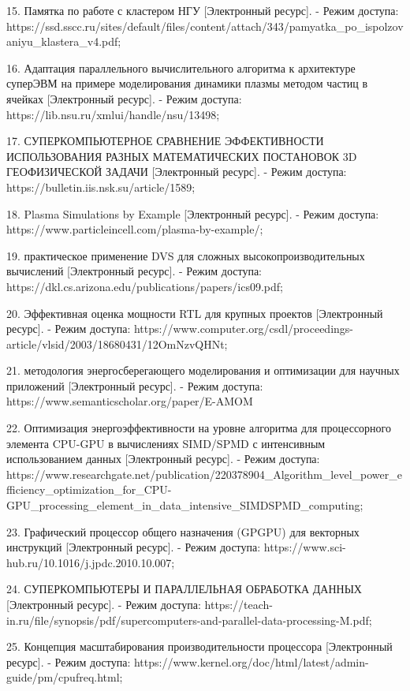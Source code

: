 \documentclass{article}
\begin{document}
15. Памятка по работе с кластером НГУ [Электронный ресурс].
   - Режим доступа: https://ssd.sscc.ru/sites/default/files/content/attach/343/pamyatka_po_ispolzovaniyu_klastera_v4.pdf;

16. Адаптация параллельного вычислительного алгоритма к архитектуре суперЭВМ на примере моделирования динамики плазмы методом частиц в ячейках [Электронный ресурс].
   - Режим доступа: https://lib.nsu.ru/xmlui/handle/nsu/13498;

17. СУПЕРКОМПЬЮТЕРНОЕ СРАВНЕНИЕ ЭФФЕКТИВНОСТИ ИСПОЛЬЗОВАНИЯ РАЗНЫХ МАТЕМАТИЧЕСКИХ ПОСТАНОВОК 3D ГЕОФИЗИЧЕСКОЙ ЗАДАЧИ [Электронный ресурс].
   - Режим доступа: https://bulletin.iis.nsk.su/article/1589;

18. Plasma Simulations by Example [Электронный ресурс].
   - Режим доступа: https://www.particleincell.com/plasma-by-example/;

19. практическое применение DVS для сложных высокопроизводительных вычислений [Электронный ресурс].
   - Режим доступа: https://dkl.cs.arizona.edu/publications/papers/ics09.pdf;

20. Эффективная оценка мощности RTL для крупных проектов [Электронный ресурс].
   - Режим доступа: https://www.computer.org/csdl/proceedings-article/vlsid/2003/18680431/12OmNzvQHNt;

21. методология энергосберегающего моделирования и оптимизации для научных приложений [Электронный ресурс].
   - Режим доступа: https://www.semanticscholar.org/paper/E-AMOM%

22. Оптимизация энергоэффективности на уровне алгоритма для процессорного элемента CPU-GPU в вычислениях SIMD/SPMD с интенсивным использованием данных [Электронный ресурс].
   - Режим доступа: https://www.researchgate.net/publication/220378904_Algorithm_level_power_efficiency_optimization_for_CPU-GPU_processing_element_in_data_intensive_SIMDSPMD_computing;

23. Графический процессор общего назначения (GPGPU) для векторных инструкций [Электронный ресурс].
   - Режим доступа: https://www.sci-hub.ru/10.1016/j.jpdc.2010.10.007;

24. СУПЕРКОМПЬЮТЕРЫ И ПАРАЛЛЕЛЬНАЯ ОБРАБОТКА ДАННЫХ [Электронный ресурс].
   - Режим доступа: https://teach-in.ru/file/synopsis/pdf/supercomputers-and-parallel-data-processing-M.pdf;

25. Концепция масштабирования производительности процессора [Электронный ресурс].
   - Режим доступа: https://www.kernel.org/doc/html/latest/admin-guide/pm/cpufreq.html;
\end{document}
